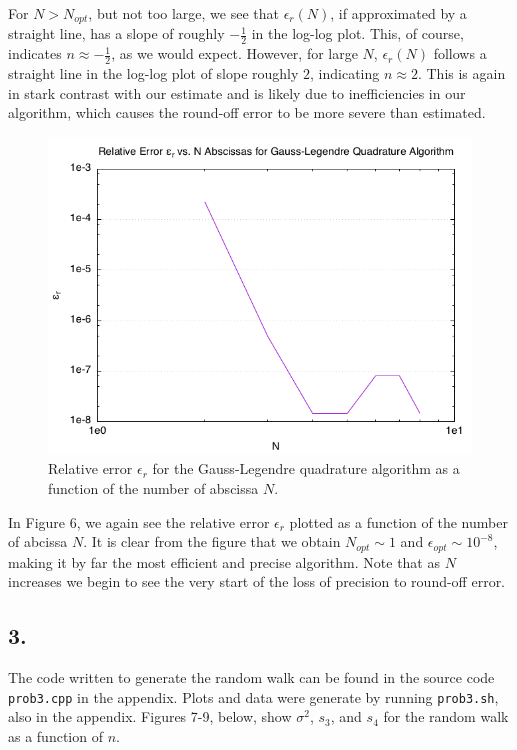 \documentclass[12pt,letterpaper]{article}
\begin{document}
For $N>N_{opt}$, but not too large, we see that $\epsilon_{r}(N)$, if approximated by a straight line, has a slope of roughly $-\frac{1}{2}$ in the log-log plot. This, of course, indicates $n\approx -\frac{1}{2}$, as we would expect. However, for large $N$, $\epsilon_{r}(N)$ follows a straight line in the log-log plot of slope roughly $2$, indicating $n\approx 2$. This is again in stark contrast with our estimate and is likely due to inefficiencies in our algorithm, which causes the round-off error to be more severe than estimated.

\begin{figure}[H]
	\centering
	\includegraphics[scale=0.6]{GL_quad.png}
	\caption{Relative error $\epsilon_r$ for the Gauss-Legendre quadrature algorithm as a function of the number of abscissa $N$.}
\end{figure}

In Figure 6, we again see the relative error $\epsilon_r$ plotted as a function of the number of abcissa $N$. It is clear from the figure that we obtain $N_{opt}\sim 1$ and $\epsilon_{opt} \sim 10^{-8}$, making it by far the most efficient and precise algorithm. Note that as $N$ increases we begin to see the very start of the loss of precision to round-off error.

\subsection*{3.}

The code written to generate the random walk can be found in the source code \verb|prob3.cpp| in the appendix. Plots and data were generate by running \verb|prob3.sh|, also in the appendix. Figures 7-9, below, show $\sigma^{2}$, $s_3$, and $s_4$ for the random walk as a function of $n$.\\
\end{document}
